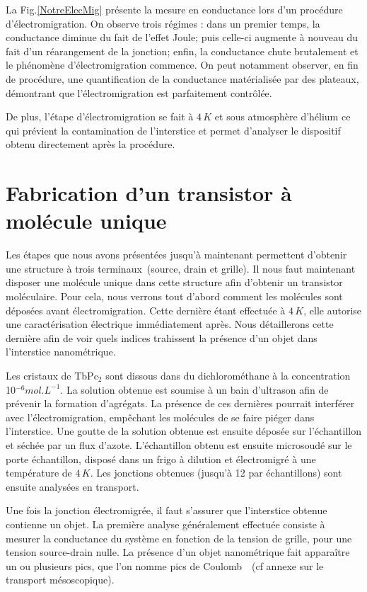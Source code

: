 La Fig.\ref{NotreElecMig} présente la mesure en conductance lors d'un procédure d'électromigration. On observe trois régimes : dans un premier temps, la conductance diminue du fait de l'effet Joule; puis celle-ci augmente à nouveau du fait d'un réarangement de la jonction; enfin, la conductance chute brutalement et le phénomène d'électromigration commence. On peut notamment observer, en fin de procédure, une quantification de la conductance matérialisée par des plateaux, démontrant que l'électromigration est parfaitement contrôlée.

De plus, l'étape d'électromigration se fait à $4\,K$ et sous atmosphère d'hélium ce qui prévient la contamination de l'interstice et permet d'analyser le dispositif obtenu directement après la procédure.

\section{Fabrication d'un transistor à molécule unique}
Les étapes que nous avons présentées jusqu'à maintenant permettent d'obtenir une structure à trois terminaux~(source, drain et grille). Il nous faut maintenant disposer une molécule unique dans cette structure afin d'obtenir un transistor moléculaire. Pour cela, nous verrons tout d'abord comment les molécules sont déposées avant électromigration. Cette dernière étant effectuée à $4\,K$, elle autorise une caractérisation électrique immédiatement après. Nous détaillerons cette dernière afin de voir quels indices trahissent la présence d'un objet dans l'interstice nanométrique.

Les cristaux de TbPc$_{2}$ sont dissous dans du dichlorométhane à la concentration 10$^{-6}mol.L^{-1}$. La solution obtenue est soumise à un bain d'ultrason afin de prévenir la formation d'agrégats. La présence de ces dernières pourrait interférer avec l'électromigration, empêchant les molécules de se faire piéger dans l'interstice. Une goutte de la solution obtenue est ensuite déposée sur l'échantillon et séchée par un flux d'azote. L'échantillon obtenu est ensuite microsoudé sur le porte échantillon, disposé dans un frigo à dilution et électromigré à une température de  $4\,K$. Les jonctions obtenues (jusqu'à 12 par échantillons) sont ensuite analysées en transport.

Une fois la jonction électromigrée, il faut s'assurer que l'interstice obtenue contienne un objet. La première analyse généralement effectuée consiste à mesurer la conductance du système en fonction de la tension de grille, pour une tension source-drain nulle. La présence d'un objet nanométrique fait apparaître un ou plusieurs pics, que l'on nomme pics de Coulomb~\cite{Beenakker1991,Wiel2002,Hanson2007}~(cf annexe sur le transport mésoscopique). 

